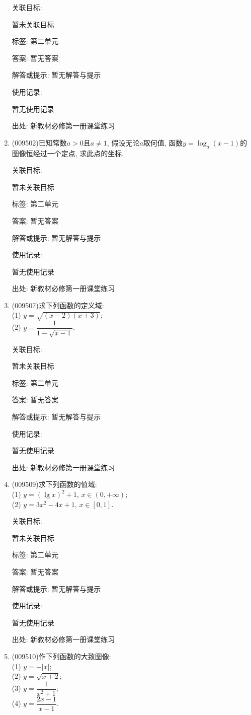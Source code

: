 \documentclass[10pt,a4paper]{article}
\begin{document}
\begin{enumerate}[1.]
关联目标:

暂未关联目标



标签: 第二单元

答案: 暂无答案

解答或提示: 暂无解答与提示

使用记录:

暂无使用记录


出处: 新教材必修第一册课堂练习
\item { (009502)}已知常数$a>0$且$a\ne 1$, 假设无论$a$取何值, 函数$y=\log_a(x-1)$的图像恒经过一个定点, 求此点的坐标.


关联目标:

暂未关联目标



标签: 第二单元

答案: 暂无答案

解答或提示: 暂无解答与提示

使用记录:

暂无使用记录


出处: 新教材必修第一册课堂练习
\item { (009507)}求下列函数的定义域:\\
(1) $y=\sqrt{(x-2)(x+3)}$;\\
(2) $y=\dfrac{1}{1-\sqrt{x-1}}$.


关联目标:

暂未关联目标



标签: 第二单元

答案: 暂无答案

解答或提示: 暂无解答与提示

使用记录:

暂无使用记录


出处: 新教材必修第一册课堂练习
\item { (009509)}求下列函数的值域:\\
(1) $y=(\lg x)^2+1$, $x\in (0, +\infty)$;\\
(2) $y=3x^2-4x+1$, $x\in [0, 1]$.


关联目标:

暂未关联目标



标签: 第二单元

答案: 暂无答案

解答或提示: 暂无解答与提示

使用记录:

暂无使用记录


出处: 新教材必修第一册课堂练习
\item { (009510)}作下列函数的大致图像:\\
(1) $y=-|x|$;\\
(2) $y= \sqrt{x+2}$;\\
(3) $y=\dfrac1{x^2+1}$;\\
(4) $y=\dfrac{2x-1}{x-1}$.



\end{enumerate}
\end{document}
